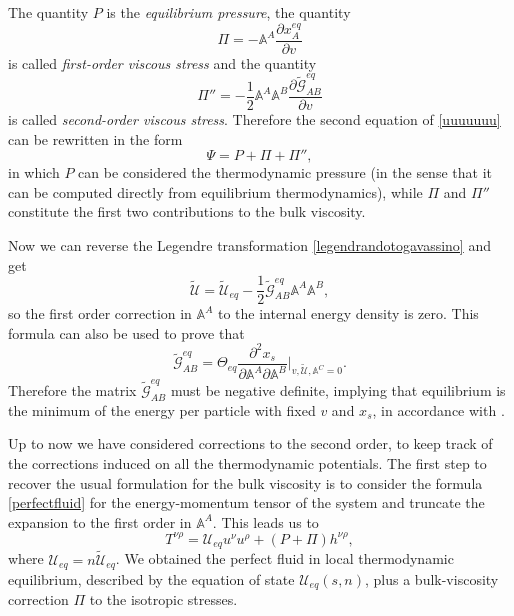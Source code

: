 \documentclass[useAMS,usenatbib,prd,twocolumn,nofootinbib]{revtex4-1}
\begin{document}
The quantity $P$ is the \textit{equilibrium pressure}, the quantity 
\begin{equation}\label{qwerty}
\Pi = - \mathbb{A}^A \dfrac{\partial x_A^{eq}}{\partial v}
\end{equation}
is called \textit{first-order viscous stress} and the quantity
\begin{equation}
\Pi'' = -\dfrac{1}{2}   \mathbb{A}^A \mathbb{A}^B \dfrac{\partial \tilde{\mathcal{G}}_{AB}^{eq}}{\partial v}
\end{equation}
is called \textit{second-order viscous stress}. Therefore the second equation of \eqref{uuuuuuu} can be rewritten in the form
\begin{equation}
\Psi = P + \Pi + \Pi'',
\end{equation}
in which $P$ can be considered the thermodynamic pressure (in the sense that it can be computed directly from equilibrium thermodynamics), while $\Pi$ and $\Pi''$ constitute the first two contributions to the bulk viscosity.


Now we can reverse the Legendre transformation \eqref{legendrandotogavassino} and get
\begin{equation}\label{polkj}
\tilde{\mathcal{U}} = \tilde{\mathcal{U}}_{eq} - \dfrac{1}{2}  \tilde{\mathcal{G}}^{eq}_{AB} \mathbb{A}^A \mathbb{A}^B,
\end{equation}
so the first order correction in $\mathbb{A}^A$ to the internal energy density is zero. This formula can also be used to prove that 
\begin{equation}
\tilde{\mathcal{G}}^{eq}_{AB}     = \Theta_{eq}\dfrac{\partial^2 x_s}{\partial \mathbb{A}^A \partial \mathbb{A}^B} \bigg|_{v,\tilde{\mathcal{U}},\mathbb{A}^C=0}.
\end{equation}
Therefore the matrix $\tilde{\mathcal{G}}^{eq}_{AB}$ must be negative definite, implying that equilibrium is the minimum of the energy per particle with fixed $v$ and $x_s$, in accordance with \cite{Callen_book}. 

Up to now we have considered corrections to the second order, to keep track of the corrections induced on all the thermodynamic potentials. The first step to recover the usual formulation for the bulk viscosity is to consider the formula \eqref{perfectfluid} for the energy-momentum tensor of the system and truncate the expansion to the first order in $\mathbb{A}^A$. This leads us to
\begin{equation}
T^{\nu \rho} = \mathcal{U}_{eq} u^\nu u^\rho + (P+\Pi)h^{\nu \rho},
\end{equation}
where $\mathcal{U}_{eq}= n \tilde{\mathcal{U}}_{eq}$. We obtained the perfect fluid in local thermodynamic equilibrium, described by the equation of state $\mathcal{U}_{eq}(s,n)$, plus a bulk-viscosity correction $\Pi$ to the isotropic stresses. 
\end{document}
